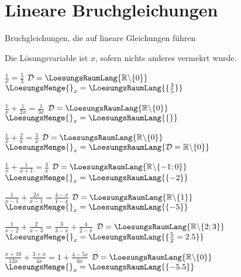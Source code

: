 

\renewcommand{\bbwAufgabenBlockID}{GL\_Br}



\usepackage{amssymb} %
\renewcommand{\metaHeaderLine}{Arbeitsblatt}
\renewcommand{\arbeitsblattTitel}{Bruchgleichungen}

\arbeitsblattHeader{}

\section{Lineare Bruchgleichungen}
Bruchgleichungen, die auf lineare Gleichungen führen

Die Lösungsvariable ist $x$, sofern nichts anderes vermekrt wurde.


\begin{bbwAufgabenBlock}
\item $\frac1x = \frac53$     \hspace{10mm}              $\mathcal{D}= \LoesungsRaumLang{\mathbb{R}\backslash\{0\}}$    $\LoesungsMenge{}_x = \LoesungsRaumLang{\{\frac35\}}$
\item $\frac1x + \frac1{2x} = \frac1{3x}$ \hspace{10mm}   $\mathcal{D}= \LoesungsRaumLang{\mathbb{R}\backslash\{0\}}$    $\LoesungsMenge{}_x = \LoesungsRaumLang{\{\}}$\noTRAINER{\newpage}
\item $\frac1x + \frac2x = \frac3x$  \hspace{10mm}       $\mathcal{D}= \LoesungsRaumLang{\mathbb{R}\backslash\{0\}}$    $\LoesungsMenge{}_x = \LoesungsRaumLang{\mathcal{D}=\mathbb{R}\backslash\{0\}}$
\item $\frac1x + \frac1{x+1} = \frac3x$ \hspace{10mm}    $\mathcal{D}= \LoesungsRaumLang{\mathbb{R}\backslash\{-1;0\}}$ $\LoesungsMenge{}_x = \LoesungsRaumLang{\{-2\}}$
\item $\frac1{x-1} + \frac{2x}{x-1} = \frac{4-x}{1-x}$ \hspace{10mm}    $\mathcal{D}= \LoesungsRaumLang{\mathbb{R}\backslash\{1\}}$ $\LoesungsMenge{}_x = \LoesungsRaumLang{\{-5\}}$\noTRAINER{\newpage}
\item $\frac1{x-2} + \frac{2}{x-3} = \frac3{3-x} + \frac{4}{2-x}$ \hspace{10mm}    $\mathcal{D}= \LoesungsRaumLang{\mathbb{R}\backslash\{2;3\}}$ $\LoesungsMenge{}_x = \LoesungsRaumLang{\{\frac{5}{2}=2.5\}}$
\item $\frac{x+10}{12x} + \frac{3+x}{4x} = 1 + \frac{4-5x}{6x}$ \hspace{10mm}    $\mathcal{D}= \LoesungsRaumLang{\mathbb{R}\backslash\{0\}}$ $\LoesungsMenge{}_x = \LoesungsRaumLang{\{-5.5\}}$
\end{bbwAufgabenBlock}

